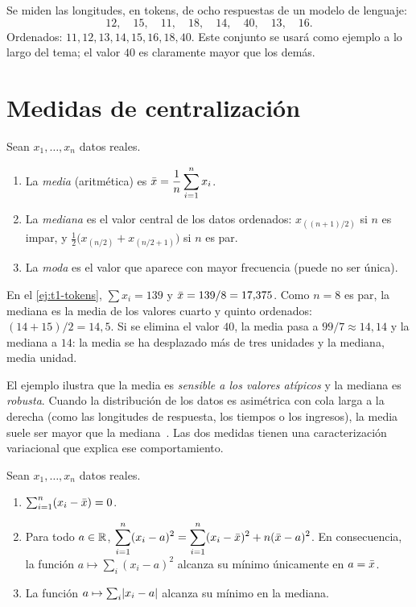 \begin{ejemplo}\label{ej:t1-tokens}
Se miden las longitudes, en tokens, de ocho respuestas de un modelo de lenguaje:
\[
12,\quad 15,\quad 11,\quad 18,\quad 14,\quad 40,\quad 13,\quad 16.
\]
Ordenados: $11,12,13,14,15,16,18,40$. Este conjunto se usará como ejemplo a lo largo del tema; el valor $40$ es claramente mayor que los demás.
\end{ejemplo}

\section{Medidas de centralización}

\begin{definicion}\label{def:t1-centro}
Sean $x_1,\dots,x_n$ datos reales.
\begin{enumerate}
  \item La \emph{media} (aritmética) es $\displaystyle\bar{x}=\frac1n\sum_{i=1}^{n}x_i$.
  \item La \emph{mediana} es el valor central de los datos ordenados: $x_{((n+1)/2)}$ si $n$ es impar, y $\tfrac12\bigl(x_{(n/2)}+x_{(n/2+1)}\bigr)$ si $n$ es par.
  \item La \emph{moda} es el valor que aparece con mayor frecuencia (puede no ser única).
\end{enumerate}
\end{definicion}

\begin{ejemplo}\label{ej:t1-media-mediana}
En el \cref{ej:t1-tokens}, $\sum x_i=139$ y $\bar{x}=139/8=17{,}375$. Como $n=8$ es par, la mediana es la media de los valores cuarto y quinto ordenados: $(14+15)/2=14{,}5$. Si se elimina el valor $40$, la media pasa a $99/7\approx 14{,}14$ y la mediana a $14$: la media se ha desplazado más de tres unidades y la mediana, media unidad.
\end{ejemplo}

El ejemplo ilustra que la media es \emph{sensible a los valores atípicos} y la mediana es \emph{robusta}. Cuando la distribución de los datos es asimétrica con cola larga a la derecha (como las longitudes de respuesta, los tiempos o los ingresos), la media suele ser mayor que la mediana~\cite[§2.6]{openstax}. Las dos medidas tienen una caracterización variacional que explica ese comportamiento.

\begin{proposicion}\label{prop:t1-extremal}
Sean $x_1,\dots,x_n$ datos reales.
\begin{enumerate}
  \item $\sum_{i=1}^{n}(x_i-\bar{x})=0$.
  \item Para todo $a\in\mathbb{R}$, $\displaystyle\sum_{i=1}^{n}(x_i-a)^{2}=\sum_{i=1}^{n}(x_i-\bar{x})^{2}+n(\bar{x}-a)^{2}$. En consecuencia, la función $a\mapsto\sum_i(x_i-a)^{2}$ alcanza su mínimo únicamente en $a=\bar{x}$.
  \item La función $a\mapsto\sum_i\lvert x_i-a\rvert$ alcanza su mínimo en la mediana.
\end{enumerate}
\end{proposicion}

